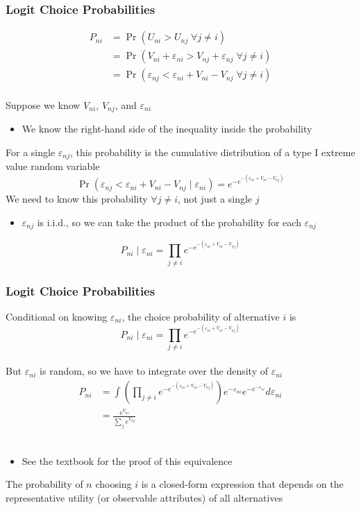 \documentclass{beamer}\usepackage[]{graphicx}\usepackage[]{xcolor}
\begin{document}
\begin{frame}\frametitle{Logit Choice Probabilities}
	\vspace{-4ex}
    \begin{align*}
    	P_{ni} & = \Pr(U_{ni} > U_{nj} \; \forall j \neq i) \\
    	& = \Pr(V_{ni} + \varepsilon_{ni} > V_{nj} + \varepsilon_{nj} \; \forall j \neq i) \\
    	& = \Pr(\varepsilon_{nj} < \varepsilon_{ni} + V_{ni} - V_{nj} \; \forall j \neq i)
    \end{align*} \\
    \vspace{1ex}
    Suppose we know $V_{ni}$, $V_{nj}$, and $\varepsilon_{ni}$
    \begin{itemize}
        \item We know the right-hand side of the inequality inside the probability
    \end{itemize}
    \vspace{2ex}
    For a single $\varepsilon_{nj}$, this probability is the cumulative distribution of a type I extreme value random variable
    $$\Pr(\varepsilon_{nj} < \varepsilon_{ni} + V_{ni} - V_{nj} \mid \varepsilon_{ni}) = e^{-e^{-(\varepsilon_{ni} + V_{ni} - V_{nj})}}$$
    We need to know this probability $\forall j \neq i$, not just a single $j$
    \begin{itemize}
        \item $\varepsilon_{nj}$ is i.i.d., so we can take the product of the probability for each $\varepsilon_{nj}$
    \end{itemize}
    $$P_{ni} \mid \varepsilon_{ni} = \prod_{j \neq i} e^{-e^{-(\varepsilon_{ni} + V_{ni} - V_{nj})}}$$
\end{frame}

\begin{frame}\frametitle{Logit Choice Probabilities}
    Conditional on knowing $\varepsilon_{ni}$, the choice probability of alternative $i$ is
    $$P_{ni} \mid \varepsilon_{ni} = \prod_{j \neq i} e^{-e^{-(\varepsilon_{ni} + V_{ni} - V_{nj})}}$$ \\
    But $\varepsilon_{ni}$ is random, so we have to integrate over the density of $\varepsilon_{ni}$
    \begin{align*}
        P_{ni} & = \int \left( \prod_{j \neq i} e^{-e^{-(\varepsilon_{ni} + V_{ni} - V_{nj})}} \right) e^{-\varepsilon_{ni}} e^{-e^{-\varepsilon_{ni}}} d\varepsilon_{ni} \\
        & = \frac{e^{V_{ni}}}{\sum_j e^{V_{nj}}}
    \end{align*} \\
    \vspace{-1ex}
    \begin{itemize}
        \item See the textbook for the proof of this equivalence
    \end{itemize}
    \vspace{2ex}
    The probability of $n$ choosing $i$ is a closed-form expression that depends on the representative utility (or observable attributes) of all alternatives
\end{frame}
\end{document}
